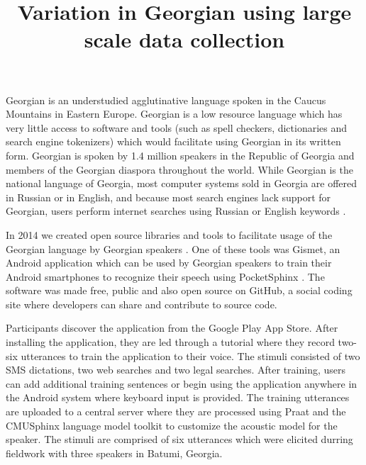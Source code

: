 \documentclass[12pt]{amsart}
\begin{document}
\title{Variation in Georgian using large scale data collection}
\maketitle

\begin{small}
\vspace{-0.2in}
\begin{center}
\end{center}
\end{small}

Georgian is an understudied agglutinative language spoken in the Caucus
Mountains in Eastern Europe. Georgian is a low resource language which has very
little access to software and tools (such as spell checkers, dictionaries and
search engine tokenizers) which would facilitate using Georgian in its written
form. Georgian is spoken by 1.4 million speakers in the Republic of Georgia and
members of the Georgian diaspora throughout the world. While Georgian is the
national language of Georgia, most computer systems sold in Georgia are offered
in Russian or in English, and because most search engines lack support for
Georgian, users perform internet searches using Russian or English keywords
\cite{Sherouse}.


In 2014 we created open source libraries and tools to facilitate usage of the
Georgian language by Georgian speakers \cite{Dunham}. One of these tools was
Gismet, an Android application which can be used by Georgian speakers to train
their Android smartphones to recognize their speech \cite{Juhar} using
PocketSphinx \cite{Huggins}. The software was made free, public and also open
source on GitHub, a social coding site where developers can share and contribute
to source code.

Participants discover the application from the Google Play App Store. After
installing the application, they are led through a tutorial where they record two-six
utterances to train the application to their voice. The stimuli consisted of two
SMS dictations, two web searches and two legal searches. After training, users can
add additional training sentences or begin using the application anywhere in the
Android system where keyboard input is provided. The training utterances are
uploaded to a central server where they are processed using Praat and the
CMUSphinx language model toolkit \cite{Walker} to customize the acoustic model
for the speaker. The stimuli are comprised of six utterances which were elicited
durring fieldwork with three speakers in Batumi, Georgia.
\end{document}
